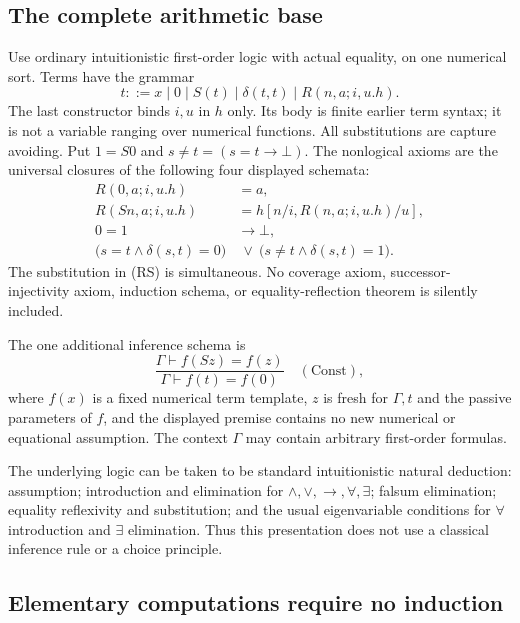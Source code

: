 \documentclass[11pt]{article}
\theoremstyle{definition}\newtheorem{definition}[theorem]{Definition}
\begin{document}
\subsection{The complete arithmetic base}

Use ordinary intuitionistic first-order logic with actual equality, on
one numerical sort.  Terms have the grammar
\[
 t ::= x\mid 0\mid S(t)\mid \delta(t,t)
          \mid R(n,a;i,u.h).
\]
The last constructor binds $i,u$ in $h$ only.  Its body is finite earlier
term syntax; it is not a variable ranging over numerical functions.
All substitutions are capture avoiding.  Put $1=S0$ and
$s\ne t=(s=t\to\bot)$.  The nonlogical axioms are the universal closures
of the following four displayed schemata:
\begin{align}
 R(0,a;i,u.h)&=a, \tag{R0}\label{eq:const-r0}\\
 R(Sn,a;i,u.h)&=h[n/i,R(n,a;i,u.h)/u],
       \tag{RS}\label{eq:const-rs}\\
 0=1&\longrightarrow\bot, \tag{Sep}\label{eq:const-sep}\\
 \bigl(s=t\land\delta(s,t)=0\bigr)&\ \lor\
 \bigl(s\ne t\land\delta(s,t)=1\bigr).
       \tag{Split}\label{eq:const-split}
\end{align}
The substitution in \textup{(RS)} is simultaneous.  No coverage axiom,
successor-injectivity axiom, induction schema, or equality-reflection
theorem is silently included.

The one additional inference schema is
\[
 \frac{\Gamma\vdash f(Sz)=f(z)}
      {\Gamma\vdash f(t)=f(0)}\quad(\mathrm{Const}),
 \tag{Const}\label{eq:const-rule}
\]
where $f(x)$ is a fixed numerical term template, $z$ is fresh for
$\Gamma,t$ and the passive parameters of $f$, and the displayed premise
contains no new numerical or equational assumption.  The context
$\Gamma$ may contain arbitrary first-order formulas.

The underlying logic can be taken to be standard intuitionistic natural
deduction: assumption; introduction and elimination for
$\land,\lor,\to,\forall,\exists$; falsum elimination; equality reflexivity
and substitution; and the usual eigenvariable conditions for
$\forall$ introduction and $\exists$ elimination.  Thus this presentation
does not use a classical inference rule or a choice principle.

\subsection{Elementary computations require no induction}
\end{document}

